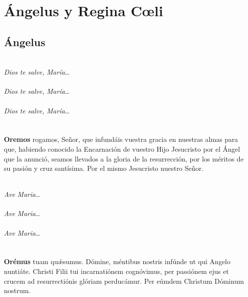 \documentclass[10pt,a4paper,oneside]{book}
\begin{document}
\chapter*{Ángelus y Regina C{\oe}li}

\section*{Ángelus}

\begin{minipage}[t]{0.475\textwidth}
    \\
    \textit{Dios te salve, María}\ldots\\
    \\
    \textit{Dios te salve, María}\ldots\\
    \\
    \textit{Dios te salve, María}\ldots\\
    \ruegapornosotrossalve\\\\
    \textbf{Oremos}
     rogamos, Señor, que infundáis vuestra gracia en nuestras almas para que,
    habiendo conocido la Encarnación de vuestro Hijo Jesucristo por el Ángel que la anunció,
    seamos llevados a la gloria de la resurrección, por los méritos de su pasión y cruz santísima.
    Por el mismo Jesucristo nuestro Señor.\\
\end{minipage}
\begin{minipage}[t]{0.475\textwidth}
    \\
    \textit{Ave Maria}\ldots\\
    \\
    \textit{Ave Maria}\ldots\\
    \\
    \textit{Ave Maria}\ldots\\
    \orapronobissalve\\\\
    \textbf{Orémus}
     tuam qu{\'\ae}sumus. Dómine, méntibus nostris infúnde ut qui Angelo nuntiáte.
    Christi Filii tui incarnatiónem cognóvimus, per passiónem ejus et crucem ad resurrectiónis glóriam perducámur.
    Per eúmdem Christum Dóminum nostrum.\\
\end{minipage}
\end{document}
